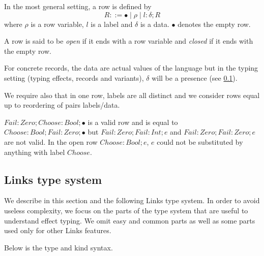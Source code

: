 \documentclass[11pt, nonacm=true, language=french, language=english]{acmart}
\begin{document}
In the most general setting, a row is defined by
\[
  R ::= \bullet \mid \rho \mid l:\delta;R
\]
where $\rho$ is a row variable, $l$ is a label and $\delta$ is a data. $\bullet$ denotes the empty row.

A row is said to be \emph{open} if it ends with a row variable and \emph{closed} if it ends with the empty row.

For concrete records, the data are actual values of the language but in the typing setting (typing effects, records and variants), $\delta$ will be a presence (see \ref{sec:links-typ}).

We require also that in one row, labels are all distinct and we consider rows equal up to reordering of pairs labels/data.

\begin{ex}
  $Fail:Zero; Choose:Bool; \bullet$ is a valid row and is equal to $Choose:Bool; Fail:Zero; \bullet$ but $Fail:Zero; Fail:Int; e$ and $Fail:Zero; Fail:Zero; e$ are not valid. In the open row $Choose:Bool; e$, $e$ could not be substituted by anything with label $Choose$.
\end{ex}


\subsection{Links type system}
\label{sec:links-typ}

We describe in this section and the following Links type system. In order to avoid useless complexity, we focus on the parts of the type system that are useful to understand effect typing. We omit easy and common parts as well as some parts used only for other Links features.

Below is the type and kind syntax.
\end{document}
